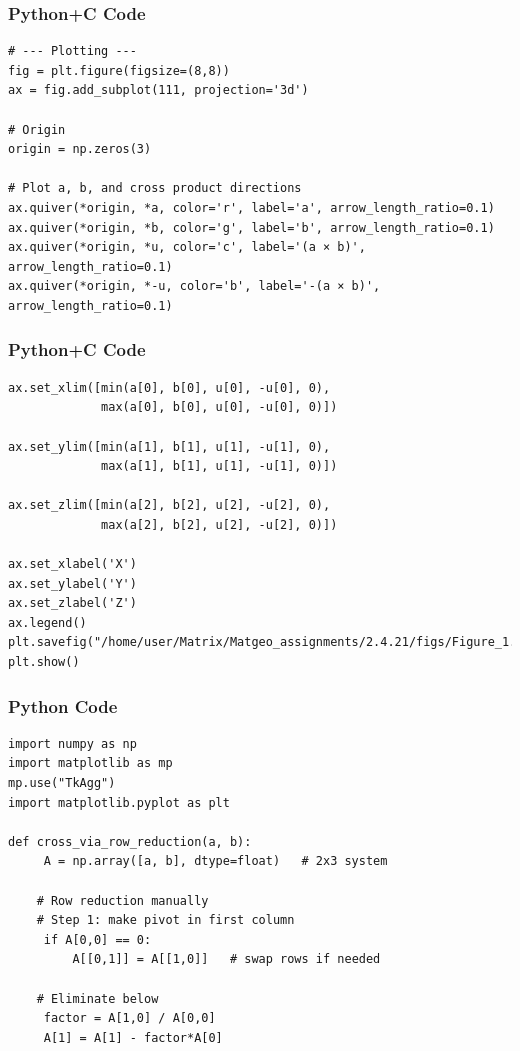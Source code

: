 \documentclass{beamer}
\begin{document}
\begin{frame}[fragile]
    \frametitle{Python+C Code}
    \begin{lstlisting}
# --- Plotting ---
fig = plt.figure(figsize=(8,8))
ax = fig.add_subplot(111, projection='3d')

# Origin
origin = np.zeros(3)

# Plot a, b, and cross product directions
ax.quiver(*origin, *a, color='r', label='a', arrow_length_ratio=0.1)
ax.quiver(*origin, *b, color='g', label='b', arrow_length_ratio=0.1)
ax.quiver(*origin, *u, color='c', label='(a × b)', arrow_length_ratio=0.1) 
ax.quiver(*origin, *-u, color='b', label='-(a × b)', arrow_length_ratio=0.1)
    \end{lstlisting}
\end{frame}
\begin{frame}[fragile]
    \frametitle{Python+C Code}
    \begin{lstlisting}
ax.set_xlim([min(a[0], b[0], u[0], -u[0], 0),
             max(a[0], b[0], u[0], -u[0], 0)])

ax.set_ylim([min(a[1], b[1], u[1], -u[1], 0),
             max(a[1], b[1], u[1], -u[1], 0)])

ax.set_zlim([min(a[2], b[2], u[2], -u[2], 0),
             max(a[2], b[2], u[2], -u[2], 0)])

ax.set_xlabel('X')
ax.set_ylabel('Y')
ax.set_zlabel('Z')
ax.legend()
plt.savefig("/home/user/Matrix/Matgeo_assignments/2.4.21/figs/Figure_1.png")
plt.show()

    \end{lstlisting}
\end{frame}

\begin{frame}[fragile]
    \frametitle{Python Code}
    \begin{lstlisting}
import numpy as np
import matplotlib as mp
mp.use("TkAgg") 
import matplotlib.pyplot as plt

def cross_via_row_reduction(a, b):
     A = np.array([a, b], dtype=float)   # 2x3 system
    
    # Row reduction manually
    # Step 1: make pivot in first column
     if A[0,0] == 0:
         A[[0,1]] = A[[1,0]]   # swap rows if needed
    
    # Eliminate below
     factor = A[1,0] / A[0,0]
     A[1] = A[1] - factor*A[0]

    \end{lstlisting}
\end{frame}
\end{document}
